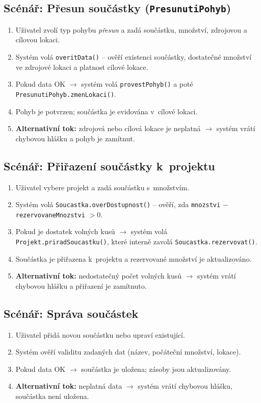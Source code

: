 \subsection{Scénář: Přesun součástky (\texttt{PresunutiPohyb})}
\begin{enumerate}
  \item Uživatel zvolí typ pohybu \emph{přesun} a zadá součástku, množství, zdrojovou a cílovou lokaci.
  \item Systém volá \texttt{overitData()} -- ověří existenci součástky, dostatečné množství ve zdrojové lokaci a platnost cílové lokace.
  \item Pokud data OK $\rightarrow$ systém volá \texttt{provestPohyb()} a poté \texttt{PresunutiPohyb.zmenLokaci()}.
  \item Pohyb je potvrzen; součástka je evidována v~cílové lokaci.
  \item \textbf{Alternativní tok:} zdrojová nebo cílová lokace je neplatná $\rightarrow$ systém vrátí chybovou hlášku a pohyb je zamítnut.
\end{enumerate}

\subsection{Scénář: Přiřazení součástky k~projektu}
\begin{enumerate}
  \item Uživatel vybere projekt a zadá součástku s~množstvím.
  \item Systém volá \texttt{Soucastka.overDostupnost()} -- ověří, zda \texttt{mnozstvi} $-$ \texttt{rezervovaneMnozstvi} $> 0$.
  \item Pokud je dostatek volných kusů $\rightarrow$ systém volá \texttt{Projekt.priradSoucastku()}, které interně zavolá \texttt{Soucastka.rezervovat()}.
  \item Součástka je přiřazena k~projektu a rezervované množství je aktualizováno.
  \item \textbf{Alternativní tok:} nedostatečný počet volných kusů $\rightarrow$ systém vrátí chybovou hlášku a přiřazení je zamítnuto.
\end{enumerate}

\subsection{Scénář: Správa součástek}
\begin{enumerate}
  \item Uživatel přidá novou součástku nebo upraví existující.
  \item Systém ověří validitu zadaných dat (název, počáteční množství, lokace).
  \item Pokud data OK $\rightarrow$ součástka je uložena; zásoby jsou aktualizovány.
  \item \textbf{Alternativní tok:} neplatná data $\rightarrow$ systém vrátí chybovou hlášku, součástka není uložena.
\end{enumerate}

